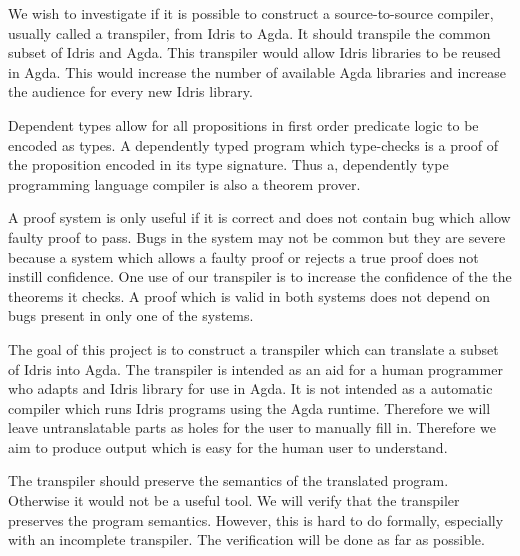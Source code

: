 We wish to investigate if it is possible to construct a source-to-source
compiler, usually called a transpiler, from Idris to Agda.  It should transpile
the common subset of Idris and Agda.  This transpiler would allow Idris
libraries to be reused in Agda. This would increase the number of available
Agda libraries and increase the audience for every new Idris library.

Dependent types allow for all propositions in first order predicate logic to be
encoded as types. A dependently typed program which type-checks is a proof of
the proposition encoded in its type signature. Thus a, dependently type
programming language compiler is also a theorem prover.

A proof system is only useful if it is correct and does not contain bug which
allow faulty proof to pass. Bugs in the system may not be common but they are
severe because a system which allows a faulty proof or rejects a true proof
does not instill confidence.
One use of our transpiler is to increase the confidence of the the theorems it
checks. A proof which is valid in both systems does not depend on bugs present
in only one of the systems.


The goal of this project is to construct a transpiler which can translate
a subset of Idris into Agda. The transpiler is intended as an aid for
a human programmer who adapts and Idris library for use in Agda.  It is not
intended as a automatic compiler which runs Idris programs using the Agda
runtime. Therefore we will leave untranslatable parts as holes for the user to
manually fill in. Therefore we aim to produce output which is easy for
the human user to understand.



The transpiler should preserve the semantics of the translated program.
Otherwise it would not be a useful tool.  We will verify that the transpiler
preserves the program semantics.  However, this is hard to do formally,
especially with an incomplete transpiler.  The verification will be done as far
as possible.

